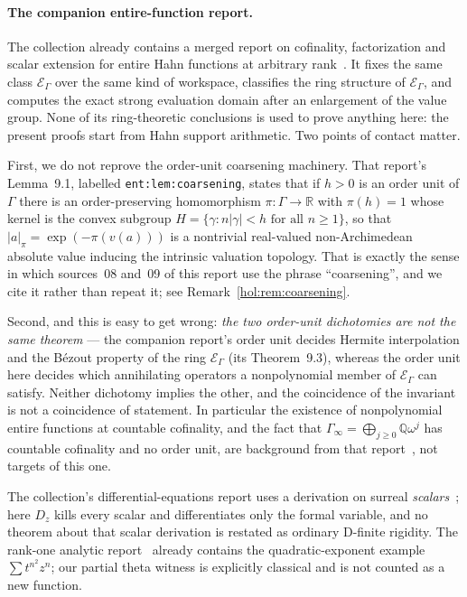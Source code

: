 \documentclass[11pt]{article}
\numberwithin{equation}{section}
\theoremstyle{definition}
\theoremstyle{remark}
\newcommand{\R}{\mathbb R}
\newcommand{\Q}{\mathbb Q}
\newcommand{\E}{\mathcal E_\Gamma}
\newcommand{\abs}[1]{\lvert#1\rvert}
\begin{document}
\paragraph{The companion entire-function report.}
The collection already contains a merged report on cofinality, factorization
and scalar extension for entire Hahn functions at arbitrary
rank~\cite{repoentire}. It fixes the same class $\E$ over the same kind of
workspace, classifies the ring structure of $\E$, and computes the exact
strong evaluation domain after an enlargement of the value group. None of its
ring-theoretic conclusions is used to prove anything here: the present proofs
start from Hahn support arithmetic. Two points of contact matter.

First, we do not reprove the order-unit coarsening machinery. That report's
Lemma~9.1, labelled \texttt{ent:lem:coarsening}, states that if $h>0$ is an
order unit of $\Gamma$ there is an order-preserving homomorphism
$\pi:\Gamma\to\R$ with $\pi(h)=1$ whose kernel is the convex subgroup
$H=\{\gamma:n\abs\gamma<h\text{ for all }n\ge1\}$, so that
$\abs a_\pi=\exp(-\pi(v(a)))$ is a nontrivial real-valued non-Archimedean
absolute value inducing the intrinsic valuation topology. That is exactly the
sense in which sources~08 and~09 of this report use the phrase
``coarsening'', and we cite it rather than repeat it; see
Remark~\ref{hol:rem:coarsening}.

Second, and this is easy to get wrong:
\emph{the two order-unit dichotomies are not the same theorem} --- the
companion report's order unit decides Hermite interpolation and the B\'ezout
property of the ring $\E$ (its Theorem~9.3), whereas the order unit here
decides which annihilating operators a nonpolynomial member of $\E$ can
satisfy. Neither dichotomy implies the other, and the coincidence of the
invariant is not a coincidence of statement. In particular the existence of
nonpolynomial entire functions at countable cofinality, and the fact that
$\Gamma_\infty=\bigoplus_{j\ge0}\Q\omega^j$ has countable cofinality and no
order unit, are background from that report~\cite{repoentire}, not targets of
this one.

The collection's differential-equations report uses a derivation on surreal
\emph{scalars}~\cite{repodifferential}; here $D_z$ kills every scalar and
differentiates only the formal variable, and no theorem about that scalar
derivation is restated as ordinary D-finite rigidity. The rank-one analytic
report~\cite{reporankone} already contains the quadratic-exponent example
$\sum t^{n^2}z^n$; our partial theta witness is explicitly classical and is
not counted as a new function.
\end{document}
